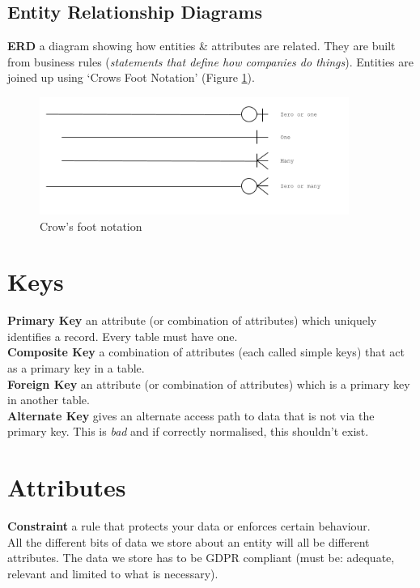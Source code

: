 \documentclass[a4paper,11pt]{article}
\begin{document}
\subsection{Entity Relationship Diagrams}
\textbf{ERD} a diagram showing how entities \& attributes are related. They are built from business rules (\textit{statements that define how companies do things}). Entities are joined up using `Crows Foot Notation' (Figure \ref{fig:crow-foot-notation}).
\begin{figure}[ht]
    \centering
    \includegraphics[width=0.9\textwidth]{../assets/relationship-links.png}
    \caption{Crow's foot notation}
    \label{fig:crow-foot-notation}
\end{figure}

\section{Keys}
\textbf{Primary Key} an attribute (or combination of attributes) which uniquely identifies a record. Every table must have one.\\
\textbf{Composite Key} a combination of attributes (each called simple keys) that act as a primary key in a table.\\
\textbf{Foreign Key} an attribute (or combination of attributes) which is a primary key in another table.\\
\textbf{Alternate Key} gives an alternate access path to data that is not via the primary key. This is \textit{bad} and if correctly normalised, this shouldn't exist. 

\section{Attributes}
\textbf{Constraint} a rule that protects your data or enforces certain behaviour.\\
All the different bits of data we store about an entity will all be different attributes. The data we store has to be GDPR compliant (must be: adequate, relevant and limited to what is necessary).
\end{document}

